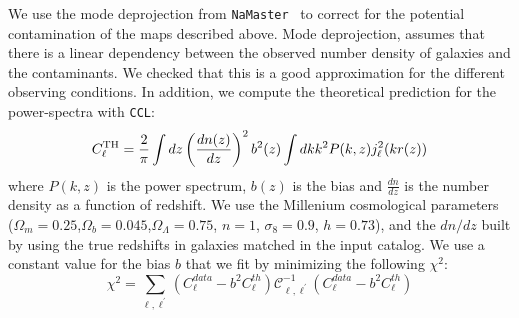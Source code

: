 \documentclass[twocolumn]{aastex62}
\begin{document}
We use the mode deprojection from \texttt{NaMaster}~\citep{2019MNRAS.484.4127A} to correct for the potential contamination of the maps described above. Mode deprojection, assumes that there is a linear dependency between the observed number density of galaxies and the contaminants. We checked that this is a good approximation for the different observing conditions. In addition, we compute the theoretical prediction for the power-spectra with \texttt{CCL}:
\begin{equation}
C_{\ell}^{\rm TH} = \frac{2}{\pi}\int{dz} \left(\frac{dn(z)}{dz}\right)^{2} b^{2}(z) \int{dk k^{2} P(k,z)j^{2}_{\ell}(kr(z))}
\end{equation}
where $P(k,z)$ is the power spectrum, $b(z)$ is the bias and $\frac{dn}{dz}$ is the number density as a function of redshift. We use the Millenium cosmological parameters~\citep{2005Nature.435.629S} ($\Omega_{m}=0.25$,$\Omega_{b}=0.045$,$\Omega_{\Lambda}=0.75$, $n=1$, $\sigma_{8}=0.9$, $h=0.73$), and the $dn/dz$ built by using the true redshifts in galaxies matched in the input catalog. We use a constant value for the bias $b$ that we fit by minimizing the following $\chi^{2}$:
\begin{equation}
\chi^{2}=\sum_{\ell,\ell^{\prime}}\left(C_{\ell}^{data}-b^{2} C_{\ell}^{th}\right)\mathcal{C}_{\ell,\ell^{\prime}}^{-1}\left(C_{\ell}^{data}-b^{2} C_{\ell}^{th}\right)
\end{equation}
\end{document}
